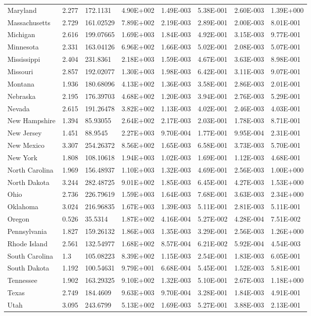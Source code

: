 \begin{longtable}[c]{p{0.75in}p{0.75in}p{0.75in}p{0.75in}p{0.75in}p{0.75in}p{0.75in}p{0.75in}}
Maryland & 2.277 & 172.1131 & 4.90E+002 & 1.49E-003 & 5.38E-001 & 2.60E-003 & 1.39E+000 \tabularnewline
Massachusetts & 2.729 & 161.02529 & 7.89E+002 & 2.19E-003 & 2.89E-001 & 2.00E-003 & 8.01E-001 \tabularnewline
Michigan & 2.616 & 199.07665 & 1.69E+003 & 1.84E-003 & 4.92E-001 & 3.15E-003 & 9.77E-001 \tabularnewline
Minnesota & 2.331 & 163.04126 & 6.96E+002 & 1.66E-003 & 5.02E-001 & 2.08E-003 & 5.07E-001 \tabularnewline
Mississippi & 2.404 & 231.8361 & 2.18E+003 & 1.59E-003 & 4.67E-001 & 3.63E-003 & 8.98E-001 \tabularnewline
Missouri & 2.857 & 192.02077 & 1.30E+003 & 1.98E-003 & 6.42E-001 & 3.11E-003 & 9.07E-001 \tabularnewline
Montana & 1.936 & 180.68096 & 4.13E+002 & 1.36E-003 & 3.58E-001 & 2.86E-003 & 2.01E-001 \tabularnewline
Nebraska & 2.195 & 176.39703 & 4.68E+002 & 1.20E-003 & 3.94E-001 & 2.76E-003 & 5.29E-001 \tabularnewline
Nevada & 2.615 & 191.26478 & 3.82E+002 & 1.13E-003 & 4.02E-001 & 2.46E-003 & 4.03E-001 \tabularnewline
New Hampshire & 1.394 & 85.93055 & 2.64E+002 & 2.17E-003 & 2.03E-001 & 1.78E-003 & 8.71E-001 \tabularnewline
New Jersey & 1.451 & 88.9545 & 2.27E+003 & 9.70E-004 & 1.77E-001 & 9.95E-004 & 2.31E-001 \tabularnewline
New Mexico & 3.307 & 254.26372 & 8.56E+002 & 1.65E-003 & 6.58E-001 & 3.73E-003 & 5.70E-001 \tabularnewline
New York & 1.808 & 108.10618 & 1.94E+003 & 1.02E-003 & 1.69E-001 & 1.12E-003 & 4.68E-001 \tabularnewline
North Carolina & 1.969 & 156.48937 & 1.10E+003 & 1.32E-003 & 4.69E-001 & 2.56E-003 & 1.00E+000 \tabularnewline
North Dakota & 3.244 & 282.48725 & 9.01E+002 & 1.85E-003 & 6.45E-001 & 4.27E-003 & 1.53E+000 \tabularnewline
Ohio & 2.736 & 226.79619 & 1.59E+003 & 1.64E-003 & 7.68E-001 & 3.63E-003 & 2.34E+000 \tabularnewline
Oklahoma & 3.024 & 216.96835 & 1.67E+003 & 1.39E-003 & 5.11E-001 & 2.81E-003 & 5.11E-001 \tabularnewline
Oregon & 0.526 & 35.5314 & 1.87E+002 & 4.16E-004 & 5.27E-002 & 4.28E-004 & 7.51E-002 \tabularnewline
Pennsylvania & 1.827 & 159.26132 & 1.86E+003 & 1.35E-003 & 3.29E-001 & 2.56E-003 & 1.26E+000 \tabularnewline
Rhode Island & 2.561 & 132.54977 & 1.68E+002 & 8.57E-004 & 6.21E-002 & 5.92E-004 & 4.54E-003 \tabularnewline
South Carolina & 1.3 & 105.08223 & 8.39E+002 & 1.15E-003 & 2.54E-001 & 1.83E-003 & 6.05E-001 \tabularnewline
South Dakota & 1.192 & 100.54631 & 9.79E+001 & 6.68E-004 & 5.45E-001 & 1.52E-003 & 5.81E-001 \tabularnewline
Tennessee & 1.902 & 163.29325 & 9.10E+002 & 1.32E-003 & 5.10E-001 & 2.67E-003 & 1.18E+000 \tabularnewline
Texas & 2.749 & 184.4609 & 9.63E+003 & 9.70E-004 & 3.28E-001 & 1.84E-003 & 4.91E-001 \tabularnewline
Utah & 3.095 & 243.6799 & 5.13E+002 & 1.69E-003 & 5.27E-001 & 3.88E-003 & 2.13E-001 \tabularnewline

\end{longtable}
